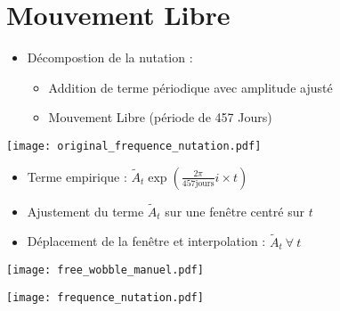 \section{Mouvement Libre}
\begin{frame}
  \begin{itemize}
    \item Décompostion de la nutation :
      \begin{itemize}
        \item Addition de terme périodique avec amplitude ajusté
        \item Mouvement Libre (période de 457 Jours)
      \end{itemize}
  \end{itemize} 

  \centerline{\texttt{[image: original\_frequence\_nutation.pdf]}}
\end{frame}

\begin{frame}
  \begin{itemize}
    \item Terme empirique : $ \tilde{A}_t \exp\left( \frac{2\pi }{457 \mbox{jours}}i \times t  \right) $
    \item Ajustement du terme $ \tilde{A}_t $ sur une fenêtre centré sur $t$ 
    \item Déplacement de la fenêtre et interpolation : $ \tilde{A}_t\ \forall\ t $
  \end{itemize}

  \centerline{\texttt{[image: free\_wobble\_manuel.pdf]}}
\end{frame}


\begin{frame}
  \texttt{[image: frequence\_nutation.pdf]}
\end{frame}

